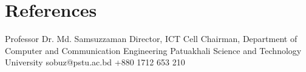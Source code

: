 \documentclass[11pt, a4paper]{article}
\begin{document}

\section{References}
\cvReference
    {Professor Dr. Md. Samsuzzaman}
    {Director, ICT Cell}
    {Chairman, Department of Computer and Communication Engineering}
    {Patuakhali Science and Technology University}
    {sobuz@pstu.ac.bd}
    {+880 1712 653 210}
\end{document}
